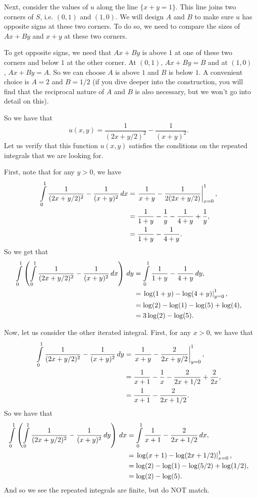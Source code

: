 Next, consider the values of \(u\) along the line \(\{x + y = 1\}\). This line joins two corners of \(S\), i.e. \((0,1)\) and \((1,0)\). We will design \(A\) and \(B\) to make
sure \(u\) has opposite signs at these two corners. To do so, we need to compare the sizes of \(Ax + By\) and \(x + y\) at these two corners.

To get opposite signs, we need that \(Ax + By\) is above \(1\) at one of these two corners and below \(1\) at the other corner. At \((0,1)\), \(Ax + By = B\) and at \((1,0)\), \(Ax + By = A\).
So we can choose \(A\) is above \(1\) and \(B\) is below \(1\). A convenient choice is \(A = 2\) and \(B = 1/2\) (if you dive deeper into the construction, you will find that the reciprocal nature of \(A\) and \(B\) is also necessary, but we won't go into detail on this). 

So we have that
\begin{equation}
u(x,y) = \frac{1}{(2x + y/2)^2} - \frac{1}{(x+y)^2}.
\end{equation}
Let us verify that this function \(u(x,y)\) satisfies the conditions on the repeated integrals that we are looking for.

First, note that for any \(y > 0\), we have
\begin{align}
\int\limits_0^1 \frac{1}{(2x + y/2)^2} - \frac{1}{(x+y)^2} \, dx & = \left.\frac{1}{x+y} - \frac{1}{2(2x + y/2)}\right|^1_{x = 0}, \\ 
    & = \frac{1}{1 + y} - \frac{1}{y} - \frac{1}{4+y} + \frac{1}{y}, \\
    & = \frac{1}{1+y} - \frac{1}{4+y}.
\end{align}
So we get that
\begin{align}
\int\limits_0^1 \left(\int\limits_0^1 \frac{1}{(2x + y/2)^2} - \frac{1}{(x+y)^2} \, dx\right) \, dy & = \int\limits_0^1 \frac{1}{1+y} - \frac{1}{4 + y} \, dy, \\
    & = \left. \log(1 +y) - \log(4 + y)\right|_{y = 0}^1, \\
    & = \log(2) - \log(1) - \log(5) + \log(4), \\
    & = 3\log(2) - \log(5). 
\end{align}

Now, let us consider the other iterated integral. First, for any \(x > 0\), we have that
\begin{align}
\int\limits_0^1 \frac{1}{(2x + y/2)^2} - \frac{1}{(x+y)^2} \, dy & = \left.\frac{1}{x+y} - \frac{2}{2x + y/2}\right|_{y = 0}^1, \\
    & = \frac{1}{x+1} - \frac{1}{x} -\frac{2}{2x+1/2} + \frac{2}{2x}, \\ 
    & = \frac{1}{x+1} - \frac{2}{2x+1/2}.
\end{align}
So we have that
\begin{align}
\int\limits_0^1 \left(\int\limits_0^1 \frac{1}{(2x + y/2)^2} - \frac{1}{(x+y)^2} \, dy\right) \, dx & = \int\limits_0^1 \frac{1}{x+1} - \frac{2}{2x+1/2} \, dx, \\
    & = \left. \log(x+1) - \log(2x + 1/2)\right|_{x = 0}^1, \\
    & = \log(2) - \log(1) - \log(5/2) + \log(1/2), \\
    & = \log(2) - \log(5). 
\end{align}
And so we see the repeated integrals are finite, but do NOT match.

